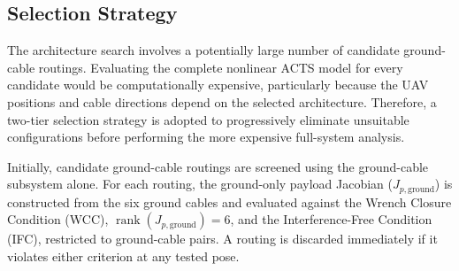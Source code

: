 
\newpage
\subsection{Selection Strategy}

The architecture search involves a potentially large number of candidate ground-cable routings. Evaluating the complete nonlinear ACTS model for every candidate would be computationally expensive, particularly because the UAV positions and cable directions depend on the selected architecture. Therefore, a two-tier selection strategy is adopted to progressively eliminate unsuitable configurations before performing the more expensive full-system analysis.

Initially, candidate ground-cable routings are screened using the ground-cable subsystem alone. For each routing, the ground-only payload Jacobian ($J_{p,\mathrm{ground}}$) is constructed from the six ground cables and evaluated against the Wrench Closure Condition (WCC), $\operatorname{rank}(J_{p,\mathrm{ground}})=6$, and the Interference-Free Condition (IFC), restricted to ground-cable pairs. A routing is discarded immediately if it violates either criterion at any tested pose.



